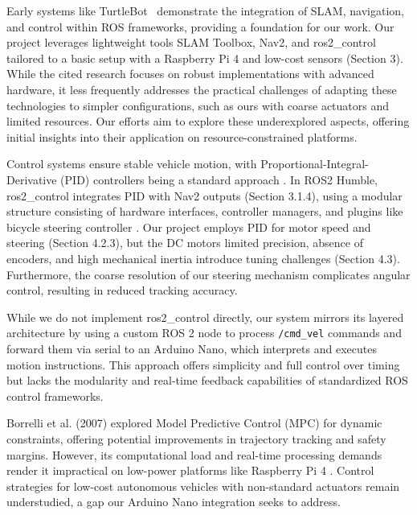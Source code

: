 \documentclass[english,project]{buwthesis}
\begin{document}
Early systems like TurtleBot~\cite{quigley2009ros} demonstrate the integration of SLAM, navigation, and control within ROS frameworks, providing a foundation for our work. Our project leverages lightweight tools SLAM Toolbox, Nav2, and ros2\_control tailored to a basic setup with a Raspberry Pi 4 and low-cost sensors (Section 3). While the cited research focuses on robust implementations with advanced hardware, it less frequently addresses the practical challenges of adapting these technologies to simpler configurations, such as ours with coarse actuators and limited resources. Our efforts aim to explore these underexplored aspects, offering initial insights into their application on resource-constrained platforms.


Control systems ensure stable vehicle motion, with Proportional-Integral-Derivative (PID) controllers being a standard approach \cite{astrom2006pid}. In ROS2 Humble, ros2\_control integrates PID with Nav2 outputs (Section 3.1.4), using a modular structure consisting of hardware interfaces, controller managers, and plugins like bicycle steering controller \cite{ros2humble2022}. Our project employs PID for motor speed and steering (Section 4.2.3), but the DC motors limited precision, absence of encoders, and high mechanical inertia introduce tuning challenges (Section 4.3). Furthermore, the coarse resolution of our steering mechanism complicates angular control, resulting in reduced tracking accuracy.

While we do not implement ros2\_control directly, our system mirrors its layered architecture by using a custom ROS 2 node to process \texttt{/cmd\_vel} commands and forward them via serial to an Arduino Nano, which interprets and executes motion instructions. This approach offers simplicity and full control over timing but lacks the modularity and real-time feedback capabilities of standardized ROS control frameworks.

Borrelli et al. (2007) explored Model Predictive Control (MPC) for dynamic constraints, offering potential improvements in trajectory tracking and safety margins. However, its computational load and real-time processing demands render it impractical on low-power platforms like Raspberry Pi 4 \cite{borrelli2007mpc}. Control strategies for low-cost autonomous vehicles with non-standard actuators remain understudied, a gap our Arduino Nano integration seeks to address.
\end{document}
